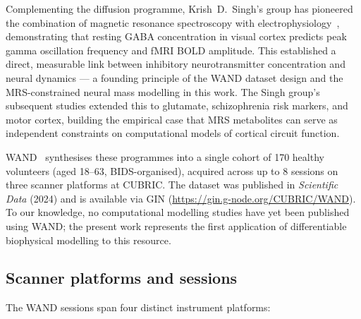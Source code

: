 \documentclass[11pt,a4paper]{article}\usepackage[]{graphicx}\usepackage[]{xcolor}
\begin{document}
Complementing the diffusion programme, Krish~D.~Singh's group has
pioneered the combination of magnetic resonance spectroscopy with
electrophysiology~\citep{Muthukumaraswamy2009gaba}, demonstrating
that resting GABA concentration in visual cortex predicts peak gamma
oscillation frequency and fMRI BOLD amplitude. This established a
direct, measurable link between inhibitory neurotransmitter
concentration and neural dynamics --- a founding principle of the WAND
dataset design and the MRS-constrained neural mass modelling in this
work. The Singh group's subsequent studies extended this to
glutamate, schizophrenia risk markers, and motor cortex, building
the empirical case that MRS metabolites can serve as independent
constraints on computational models of cortical circuit function.

WAND~\citep{Mayerand2025wand} synthesises these programmes into a
single cohort of 170 healthy volunteers (aged 18--63, BIDS-organised),
acquired across up to 8 sessions on three scanner platforms at CUBRIC.
The dataset was published in \textit{Scientific Data} (2024) and is
available via GIN (\url{https://gin.g-node.org/CUBRIC/WAND}). To our
knowledge, no computational modelling studies have yet been published
using WAND; the present work represents the first application of
differentiable biophysical modelling to this resource.

\subsection{Scanner platforms and sessions}

The WAND sessions span four distinct instrument platforms:
\end{document}
